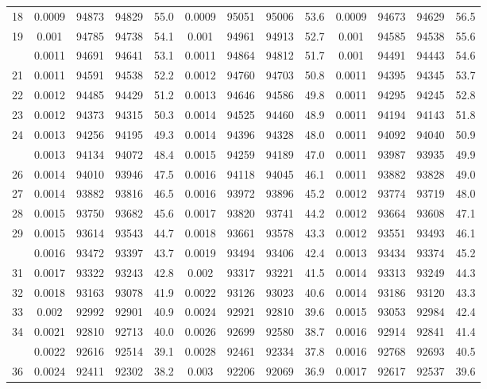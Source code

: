 \documentclass[
  14pt,
]{article}
\begin{document}
\begin{longtable}[t]{lcccccccccccc}
18 & 0.0009 & 94873 & 94829 & 55.0 & 0.0009 & 95051 & 95006 & 53.6 & 0.0009 & 94673 & 94629 & 56.5\\
19 & 0.001 & 94785 & 94738 & 54.1 & 0.001 & 94961 & 94913 & 52.7 & 0.001 & 94585 & 94538 & 55.6\\
\addlinespace
20 & 0.0011 & 94691 & 94641 & 53.1 & 0.0011 & 94864 & 94812 & 51.7 & 0.001 & 94491 & 94443 & 54.6\\
21 & 0.0011 & 94591 & 94538 & 52.2 & 0.0012 & 94760 & 94703 & 50.8 & 0.0011 & 94395 & 94345 & 53.7\\
22 & 0.0012 & 94485 & 94429 & 51.2 & 0.0013 & 94646 & 94586 & 49.8 & 0.0011 & 94295 & 94245 & 52.8\\
23 & 0.0012 & 94373 & 94315 & 50.3 & 0.0014 & 94525 & 94460 & 48.9 & 0.0011 & 94194 & 94143 & 51.8\\
24 & 0.0013 & 94256 & 94195 & 49.3 & 0.0014 & 94396 & 94328 & 48.0 & 0.0011 & 94092 & 94040 & 50.9\\
\addlinespace
25 & 0.0013 & 94134 & 94072 & 48.4 & 0.0015 & 94259 & 94189 & 47.0 & 0.0011 & 93987 & 93935 & 49.9\\
26 & 0.0014 & 94010 & 93946 & 47.5 & 0.0016 & 94118 & 94045 & 46.1 & 0.0011 & 93882 & 93828 & 49.0\\
27 & 0.0014 & 93882 & 93816 & 46.5 & 0.0016 & 93972 & 93896 & 45.2 & 0.0012 & 93774 & 93719 & 48.0\\
28 & 0.0015 & 93750 & 93682 & 45.6 & 0.0017 & 93820 & 93741 & 44.2 & 0.0012 & 93664 & 93608 & 47.1\\
29 & 0.0015 & 93614 & 93543 & 44.7 & 0.0018 & 93661 & 93578 & 43.3 & 0.0012 & 93551 & 93493 & 46.1\\
\addlinespace
30 & 0.0016 & 93472 & 93397 & 43.7 & 0.0019 & 93494 & 93406 & 42.4 & 0.0013 & 93434 & 93374 & 45.2\\
31 & 0.0017 & 93322 & 93243 & 42.8 & 0.002 & 93317 & 93221 & 41.5 & 0.0014 & 93313 & 93249 & 44.3\\
32 & 0.0018 & 93163 & 93078 & 41.9 & 0.0022 & 93126 & 93023 & 40.6 & 0.0014 & 93186 & 93120 & 43.3\\
33 & 0.002 & 92992 & 92901 & 40.9 & 0.0024 & 92921 & 92810 & 39.6 & 0.0015 & 93053 & 92984 & 42.4\\
34 & 0.0021 & 92810 & 92713 & 40.0 & 0.0026 & 92699 & 92580 & 38.7 & 0.0016 & 92914 & 92841 & 41.4\\
\addlinespace
35 & 0.0022 & 92616 & 92514 & 39.1 & 0.0028 & 92461 & 92334 & 37.8 & 0.0016 & 92768 & 92693 & 40.5\\
36 & 0.0024 & 92411 & 92302 & 38.2 & 0.003 & 92206 & 92069 & 36.9 & 0.0017 & 92617 & 92537 & 39.6\\

\end{longtable}
\end{document}

